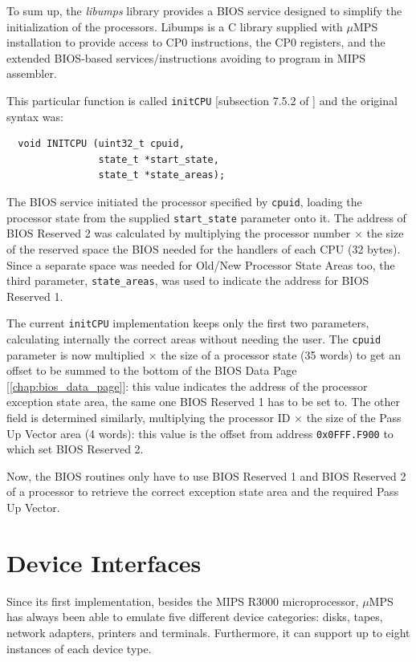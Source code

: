 \documentclass[12pt,a4paper,openright,twoside]{report}
\begin{document}
To sum up, the \textit{libumps} library provides a BIOS service designed to simplify the initialization of the processors.
Libumps is a C library supplied with $\mu$MPS installation to provide access to CP0 instructions, the CP0 registers, and the extended BIOS-based services/instructions avoiding to program in MIPS assembler.

This particular function is called \texttt{initCPU} [subsection 7.5.2 of \cite{old_pops}] and the original syntax was:
\begin{verbatim}
  void INITCPU (uint32_t cpuid,
                state_t *start_state,
                state_t *state_areas);
\end{verbatim}

The BIOS service initiated the processor specified by \texttt{cpuid}, loading the processor state from the supplied \texttt{start\_state} parameter onto it.
The address of BIOS Reserved 2 was calculated by multiplying the processor number $\times$ the size of the reserved space the BIOS needed for the handlers of each CPU (32 bytes).
Since a separate space was needed for Old/New Processor State Areas too, the third parameter, \texttt{state\_areas}, was used to indicate the address for BIOS Reserved 1.

The current \texttt{initCPU} implementation keeps only the first two parameters, calculating internally the correct areas without needing the user.
The \texttt{cpuid} parameter is now multiplied $\times$ the size of a processor state (35 words) to get an offset to be summed to the bottom of the BIOS Data Page [\autoref{chap:bios_data_page}]: this value indicates the address of the processor exception state area, the same one BIOS Reserved 1 has to be set to.
The other field is determined similarly, multiplying the processor ID $\times$ the size of the Pass Up Vector area (4 words): this value is the offset from address \texttt{0x0FFF.F900} to which set BIOS Reserved 2.

Now, the BIOS routines only have to use BIOS Reserved 1 and BIOS Reserved 2 of a processor to retrieve the correct exception state area and the required Pass Up Vector.

\chapter{Device Interfaces}
\lhead[\fancyplain{}{\bfseries\thepage}]{\fancyplain{}{\bfseries\rightmark}}
Since its first implementation, besides the MIPS R3000 microprocessor, $\mu$MPS has always been able to emulate five different device categories: disks, tapes, network adapters, printers and terminals.
Furthermore, it can support up to eight instances of each device type.
\end{document}
